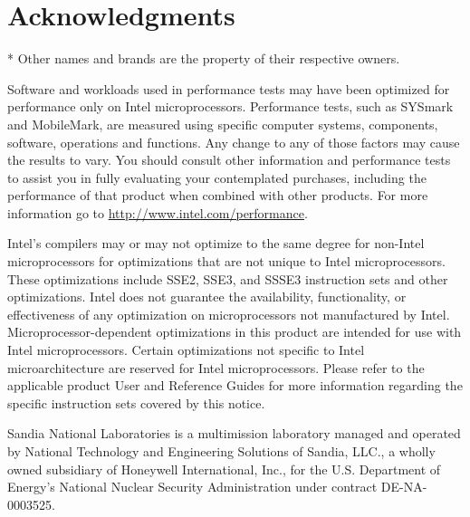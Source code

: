 \section*{Acknowledgments}

* Other names and brands are the property of their respective owners.

Software and workloads used in performance tests may have been
optimized for performance only on Intel microprocessors.  Performance
tests, such as SYSmark and MobileMark, are measured using specific
computer systems, components, software, operations and functions.  Any
change to any of those factors may cause the results to vary.  You
should consult other information and performance tests to assist you
in fully evaluating your contemplated purchases, including the
performance of that product when combined with other products.  For
more information go to \url{http://www.intel.com/performance}.

Intel's compilers may or may not optimize to the same degree for
non-Intel microprocessors for optimizations that are not unique to
Intel microprocessors. These optimizations include SSE2, SSE3, and
SSSE3 instruction sets and other optimizations. Intel does not
guarantee the availability, functionality, or effectiveness of any
optimization on microprocessors not manufactured by
Intel. Microprocessor-dependent optimizations in this product are
intended for use with Intel microprocessors. Certain optimizations not
specific to Intel microarchitecture are reserved for Intel
microprocessors. Please refer to the applicable product User and
Reference Guides for more information regarding the specific
instruction sets covered by this notice.


Sandia National Laboratories is a multimission laboratory managed
and operated by National Technology and Engineering Solutions of
Sandia, LLC., a wholly owned subsidiary of Honeywell International,
Inc., for the U.S. Department of Energy's National Nuclear Security
Administration under contract DE-NA-0003525.


